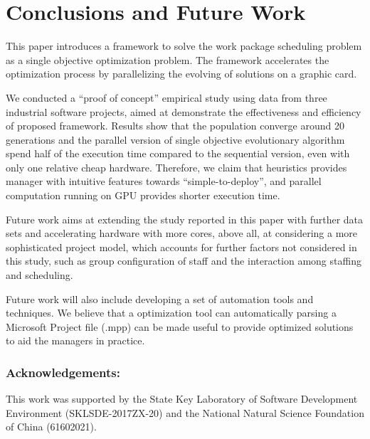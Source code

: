 %
%

\section{Conclusions and Future Work}
%
This paper introduces a framework to solve the work package scheduling problem as a single objective optimization problem. The framework accelerates the optimization process by parallelizing the evolving of solutions on a graphic card. 

We conducted a ``proof of concept'' empirical study using data from three industrial software projects, aimed at demonstrate the effectiveness and efficiency of proposed framework.
Results show that the population converge around 20 generations and the parallel version of single objective evolutionary algorithm spend half of the execution time compared to the sequential version, even with only one relative cheap hardware. 
Therefore, we claim that heuristics provides manager with intuitive features towards ``simple-to-deploy'', and parallel computation running on GPU provides shorter execution time.

Future work aims at extending the study reported in this paper with further data sets and accelerating hardware with more cores, above all, at considering a more sophisticated project model, which accounts for further factors not considered in this study, such as group configuration of staff and the interaction among staffing and scheduling. 

Future work will also include developing a set of automation tools and techniques. We believe that a optimization tool can automatically parsing a Microsoft Project file (.mpp) can be made useful to provide optimized solutions to aid the managers in practice.

\subsubsection{\small{Acknowledgements:}} \small{This work was supported by the State Key Laboratory of Software Development Environment (SKLSDE-2017ZX-20) and the National Natural Science Foundation of China (61602021).}

